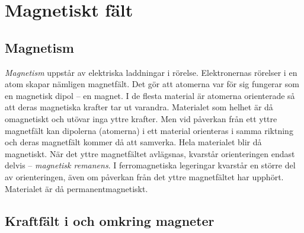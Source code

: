 \section{Magnetiskt fält}
\label{elektromagnetiskafält}

\subsection{Magnetism}


\emph{Magnetism} uppstår av elektriska laddningar i rörelse.
Elektronernas rörelser i en atom skapar nämligen magnetfält.
Det gör att atomerna var för sig fungerar som en magnetisk dipol -- en magnet.
I de flesta material är atomerna orienterade så att deras magnetiska krafter
tar ut varandra.
Materialet som helhet är då omagnetiskt och utövar inga yttre krafter.
Men vid påverkan från ett yttre magnetfält kan dipolerna (atomerna) i ett
material orienteras i samma riktning och deras magnetfält kommer då att
samverka. Hela materialet blir då magnetiskt.
När det yttre magnetfältet avlägsnas, kvarstår orienteringen endast delvis --
\emph{magnetisk remanens}.
I ferromagnetiska legeringar kvarstår en större del av orienteringen, även om
påverkan från det yttre magnetfältet har upphört.
Materialet är då permanentmagnetiskt.

\subsection{Kraftfält i och omkring magneter}

